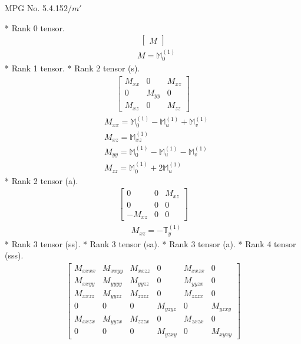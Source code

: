 \documentclass[fleqn,8pt,landscape]{jsarticle}
\begin{document}
\setcounter{MaxMatrixCols}{32}

\renewcommand{\tablename}{Table~}
\renewcommand{\figurename}{Figure~}
\begin{center}
\LARGE
MPG No. 5.4.15\quad$2/m'$
\end{center}
* Rank 0 tensor.
\begin{align*}
\begin{bmatrix} M \end{bmatrix}
\end{align*}
\begin{align*}
& M = \mathbb{M}_{0}^{(1)}
\end{align*}
* Rank 1 tensor.
* Rank 2 tensor (s).
\begin{align*}
\begin{bmatrix} M_{xx} & 0 & M_{xz} \\ 0 & M_{yy} & 0 \\ M_{xz} & 0 & M_{zz} \end{bmatrix}
\end{align*}
\begin{align*}
& M_{xx} = \mathbb{M}_{0}^{(1)} - \mathbb{M}_{u}^{(1)} + \mathbb{M}_{v}^{(1)} \\
& M_{xz} = \mathbb{M}_{xz}^{(1)} \\
& M_{yy} = \mathbb{M}_{0}^{(1)} - \mathbb{M}_{u}^{(1)} - \mathbb{M}_{v}^{(1)} \\
& M_{zz} = \mathbb{M}_{0}^{(1)} + 2 \mathbb{M}_{u}^{(1)}
\end{align*}
* Rank 2 tensor (a).
\begin{align*}
\begin{bmatrix} 0 & 0 & M_{xz} \\ 0 & 0 & 0 \\ - M_{xz} & 0 & 0 \end{bmatrix}
\end{align*}
\begin{align*}
& M_{xz} = - \mathbb{T}_{y}^{(1)}
\end{align*}
* Rank 3 tensor (ss).
* Rank 3 tensor (sa).
* Rank 3 tensor (a).
* Rank 4 tensor (sss).
\begin{align*}
\begin{bmatrix} M_{xxxx} & M_{xxyy} & M_{xxzz} & 0 & M_{xxzx} & 0 \\ M_{xxyy} & M_{yyyy} & M_{yyzz} & 0 & M_{yyzx} & 0 \\ M_{xxzz} & M_{yyzz} & M_{zzzz} & 0 & M_{zzzx} & 0 \\ 0 & 0 & 0 & M_{yzyz} & 0 & M_{yzxy} \\ M_{xxzx} & M_{yyzx} & M_{zzzx} & 0 & M_{zxzx} & 0 \\ 0 & 0 & 0 & M_{yzxy} & 0 & M_{xyxy} \end{bmatrix}
\end{align*}
\end{document}
